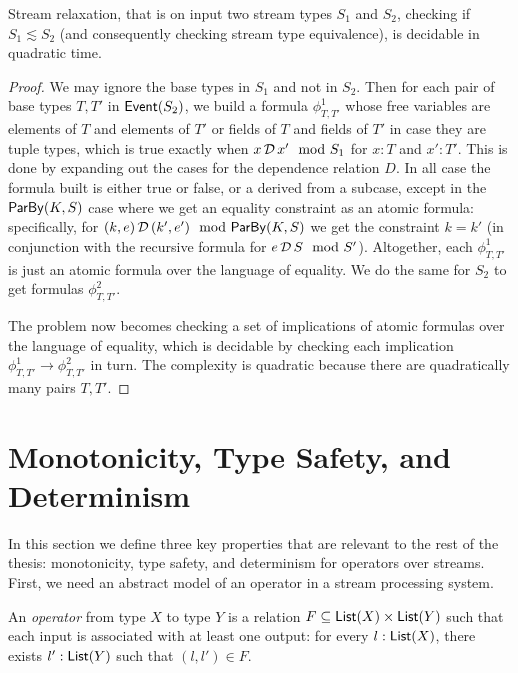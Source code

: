 \begin{theorem}
\label{thm:stream-relaxation-decidable}
Stream relaxation, that is on input two stream types $S_1$ and $S_2$, checking if $S_1 \lesssim S_2$ (and consequently checking stream type equivalence), is decidable in quadratic time.
\end{theorem}
\begin{proof}
We may ignore the base types in $S_1$ and not in $S_2$.
Then for each pair of base types $T, T'$ in $\mathsf{Event}(S_2)$,
we build a formula $\phi^1_{T, T'}$ whose free variables are elements of $T$ and elements of $T'$ or fields of $T$ and fields of $T'$ in case they are tuple types,
which is true exactly when
$x \,\mathcal{D}\, x' \mod {S_1}$ for $x : T$ and $x' : T'$.
This is done by expanding out the cases for the dependence relation $D$.
In all case the formula built is either true or false, or a derived from a subcase,
except in the $\mathsf{ParBy}({K}, S)$ case where
we get an equality constraint as an atomic formula:
specifically, for $(k, e) \,\mathcal{D}\, (k', e') \mod {\mathsf{ParBy}({K}, S)}$
we get the constraint $k = k'$ (in conjunction with the recursive formula for $e \,\mathcal{D}\, S \mod {S'}$).
Altogether, each $\phi^1_{T, T'}$ is just an atomic formula over the
language of equality.
We do the same for $S_2$ to get formulas $\phi^2_{T, T'}$.

The problem now becomes checking a set of implications
of atomic formulas over the language of equality, which is
decidable by checking each implication
$\phi^1_{T, T'} \to \phi^2_{T, T'}$
in turn.
The complexity is quadratic because there are quadratically many pairs $T, T'$.
\end{proof}

\section{Monotonicity, Type Safety, and Determinism}
\label{sec:operator-properties}

In this section we define three key properties that are relevant to the rest of the thesis: monotonicity, type safety, and determinism for operators over streams.
First, we need an abstract model of an operator in a stream processing system.
\begin{definition}
\label{def:operator}
An \emph{operator} from type $X$ to type $Y$ is a relation
$F \subseteq \mathsf{List}(X) \times \mathsf{List}(Y)$ such that each input is associated with at least one output:
for every $l: \mathsf{List}(X)$, there exists $l': \mathsf{List}(Y)$
such that $(l, l') \in F$.
\end{definition}

